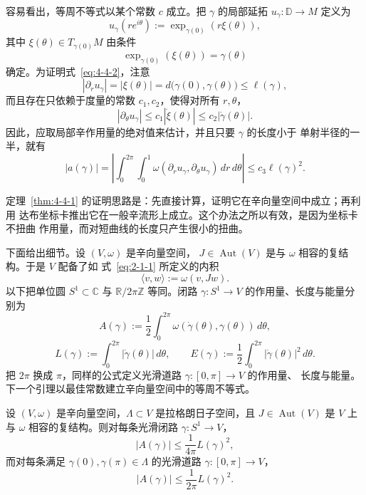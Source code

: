 \begin{remark}\label{rem:4-4-3}
容易看出，等周不等式以某个常数 $c$ 成立。把 $\gamma$ 的局部延拓
$u_\gamma:\mathbb D\to M$ 定义为
\begin{equation}\label{eq:4-4-3}
  u_\gamma(re^{i\theta}):=\exp_{\gamma(0)}(r\xi(\theta)),
\end{equation}
其中 $\xi(\theta)\in T_{\gamma(0)}M$ 由条件
\[
  \exp_{\gamma(0)}(\xi(\theta))=\gamma(\theta)
\]
确定。为证明式~\eqref{eq:4-4-2}，注意
\[
  |\partial_ru_\gamma|
  =|\xi(\theta)|
  =d\bigl(\gamma(0),\gamma(\theta)\bigr)
  \le\ell(\gamma),
\]
而且存在只依赖于度量的常数 $c_1,c_2$，使得对所有 $r,\theta$，
\[
  |\partial_\theta u_\gamma|
  \le c_1|\dot\xi(\theta)|
  \le c_2|\dot\gamma(\theta)|.
\]
因此，应取局部辛作用量的绝对值来估计，并且只要 $\gamma$ 的长度小于
单射半径的一半，就有
\[
  |a(\gamma)|
  =\left|\int_0^{2\pi}\int_0^1
    \omega(\partial_ru_\gamma,\partial_\theta u_\gamma)
    \,dr\,d\theta\right|
  \le c_3\ell(\gamma)^2.
\]
\end{remark}

定理~\ref{thm:4-4-1} 的证明思路是：先直接计算，证明它在辛向量空间中成立；再利用
达布坐标卡推出它在一般辛流形上成立。这个办法之所以有效，是因为坐标卡不扭曲
作用量，而对短曲线的长度只产生很小的扭曲。

下面给出细节。设 $(V,\omega)$ 是辛向量空间，
$J\in\operatorname{Aut}(V)$ 是与 $\omega$ 相容的复结构。于是 $V$ 配备了如
式~\eqref{eq:2-1-1}
所定义的内积
\[
  \langle v,w\rangle:=\omega(v,Jw).
\]
以下把单位圆 $S^1\subset\mathbb C$ 与 $\mathbb R/2\pi\mathbb Z$ 等同。闭路
$\gamma:S^1\to V$ 的作用量、长度与能量分别为
\[
  A(\gamma):=\frac12\int_0^{2\pi}
  \omega(\dot\gamma(\theta),\gamma(\theta))\,d\theta,
\]
\[
  L(\gamma):=\int_0^{2\pi}|\dot\gamma(\theta)|\,d\theta,
  \qquad
  E(\gamma):=\frac12\int_0^{2\pi}|\dot\gamma(\theta)|^2\,d\theta.
\]
把 $2\pi$ 换成 $\pi$，同样的公式定义光滑道路 $\gamma:[0,\pi]\to V$ 的作用量、
长度与能量。下一个引理以最佳常数建立辛向量空间中的等周不等式。

\begin{lemma}\label{lem:4-4-4}
设 $(V,\omega)$ 是辛向量空间，$\Lambda\subset V$ 是拉格朗日子空间，且
$J\in\operatorname{Aut}(V)$ 是 $V$ 上与 $\omega$ 相容的复结构。则对每条光滑闭路
$\gamma:S^1\to V$，
\begin{equation}\label{eq:4-4-4}
  |A(\gamma)|\le\frac1{4\pi}L(\gamma)^2,
\end{equation}
而对每条满足 $\gamma(0),\gamma(\pi)\in\Lambda$ 的光滑道路
$\gamma:[0,\pi]\to V$，
\begin{equation}\label{eq:4-4-5}
  |A(\gamma)|\le\frac1{2\pi}L(\gamma)^2.
\end{equation}
\end{lemma}


